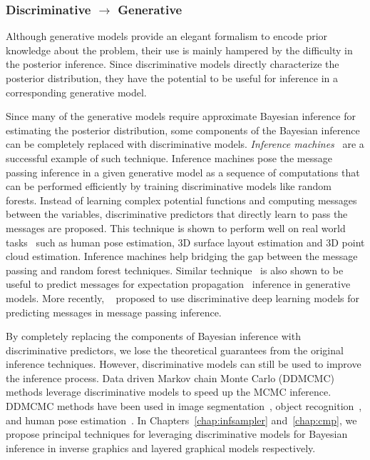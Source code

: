 \subsubsection{Discriminative $\rightarrow $ Generative}

Although generative models provide an elegant formalism to encode prior
knowledge about the problem, their use is mainly hampered by the difficulty in
the posterior inference. Since discriminative models directly characterize the posterior
distribution, they have the potential to be useful for inference in a corresponding
generative model.

Since many of the generative models require approximate
Bayesian inference for estimating the posterior distribution, some components of
the Bayesian inference can be completely replaced with discriminative models.
\textit{Inference machines}~\cite{Ross2011} are a successful example of such technique.
Inference machines pose the message passing inference in a given generative model
as a sequence of computations that can be performed efficiently by training
discriminative models like random forests. Instead of learning complex potential
functions and computing messages between the variables, discriminative predictors
that directly learn to pass the messages are proposed. This technique
is shown to perform well on real world tasks~\cite{Ross2011,ramakrishna2014pose,shapovalov2013spatial}
such as human pose estimation, 3D surface layout estimation and 3D point cloud estimation.
Inference machines help bridging the gap between the message
passing and random forest techniques. Similar technique~\cite{Heess2013} is also shown to be
useful to predict messages for
expectation propagation~\cite{Minka2001} inference in generative models. More recently,
~\cite{lin2015deeply} proposed to use discriminative deep learning models for predicting
messages in message passing inference.

By completely replacing the components of Bayesian inference with discriminative predictors,
we lose the theoretical guarantees from the original inference
techniques. However,
discriminative models can still be used to improve the inference process.
Data driven Markov chain Monte Carlo (DDMCMC)~\cite{tu2002image} methods
leverage discriminative models to speed up the MCMC inference.
DDMCMC methods have been used in image segmentation~\cite{tu2002image}, object
recognition~\cite{zhu2000integrating}, and human pose estimation~\cite{lee2004proposal}.
In Chapters~\ref{chap:infsampler} and~\ref{chap:cmp}, we propose
principal techniques for leveraging discriminative models for Bayesian
inference in inverse graphics and layered graphical models respectively.

